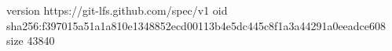 version https://git-lfs.github.com/spec/v1
oid sha256:f397015a51a1a810e1348852ecd00113b4e5dc445c8f1a3a44291a0eeadce608
size 43840
